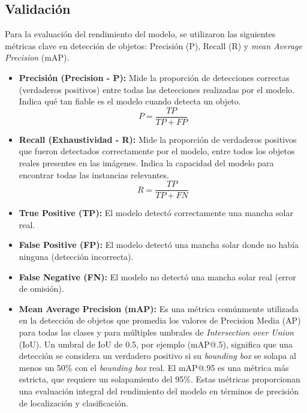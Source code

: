 \documentclass[journal]{IEEEtran}
\begin{document}
\subsection{Validación}
Para la evaluación del rendimiento del modelo, se utilizaron las siguientes métricas clave en detección de objetos: Precisión (P), Recall (R) y \textit{mean Average Precision} (mAP).
\begin{itemize}
    \item \textbf{Precisión (Precision - P):} Mide la proporción de detecciones correctas (verdaderos positivos) entre todas las detecciones realizadas por el modelo. Indica qué tan fiable es el modelo cuando detecta un objeto. \[ P = \frac{TP}{TP+FP} \]
    \item \textbf{Recall (Exhaustividad - R):} Mide la proporción de verdaderos positivos que fueron detectados correctamente por el modelo, entre todos los objetos reales presentes en las imágenes. Indica la capacidad del modelo para encontrar todas las instancias relevantes. \[ R = \frac{TP}{TP+FN} \]
    \item \textbf{True Positive (TP):} El modelo detectó correctamente una mancha solar real.
    \item \textbf{False Positive (FP):} El modelo detectó una mancha solar donde no había ninguna (detección incorrecta).
    \item \textbf{False Negative (FN):} El modelo no detectó una mancha solar real (error de omisión).
    \item \textbf{Mean Average Precision (mAP):} Es una métrica comúnmente utilizada en la detección de objetos que promedia los valores de Precision Media (AP) para todas las clases y para múltiples umbrales de \textit{Intersection over Union} (IoU). Un umbral de IoU de 0.5, por ejemplo (mAP@.5), significa que una detección se considera un verdadero positivo si su \textit{bounding box} se solapa al menos un 50\% con el \textit{bounding box} real. El mAP@.95 es una métrica más estricta, que requiere un solapamiento del 95\%. Estas métricas proporcionan una evaluación integral del rendimiento del modelo en términos de precisión de localización y clasificación.
\end{itemize}
\end{document}
